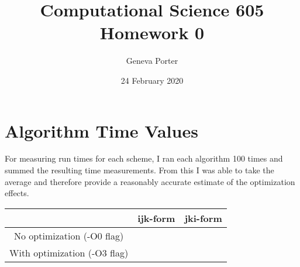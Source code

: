 \documentclass{article}
\title{Computational Science 605 \\ Homework 0}
\author{Geneva Porter}
\date{24 February 2020}
\begin{document}
\maketitle

\section*{Algorithm Time Values}

For measuring run times for each scheme, I ran each algorithm 100 times and summed the resulting time measurements. From this I was able to take the average and therefore provide a reasonably accurate estimate of the optimization effects.

\begin{table}[h]
    \centering
    \begin{tabular}{|c|c|c|} \hline
        ~ & ijk-form & jki-form \\ \hline
         No optimization (-O0 flag)&  ~ & ~\\ \hline
         With optimization (-O3 flag)& ~ & ~ \\ \hline
    \end{tabular}
\end{table}
\end{document}
